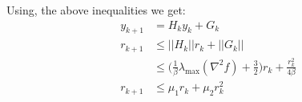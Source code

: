 Using, the above inequalities we get:
\begin{equation}
\begin{aligned}
y_{k+1} &= H_k y_k + G_k \\
r_{k+1} & \leq  ||H_k|| r_k + ||G_k|| \\
& \leq \big(\frac{1}{\beta} \lambda_{\max}(\nabla^2 f) + \frac{3}{2} \big)r_k + \frac{r_k^2}{4\beta} \\
r_{k+1} & \leq \mu_1 r_k + \mu_2 r_k^2
\end{aligned}
\end{equation}
